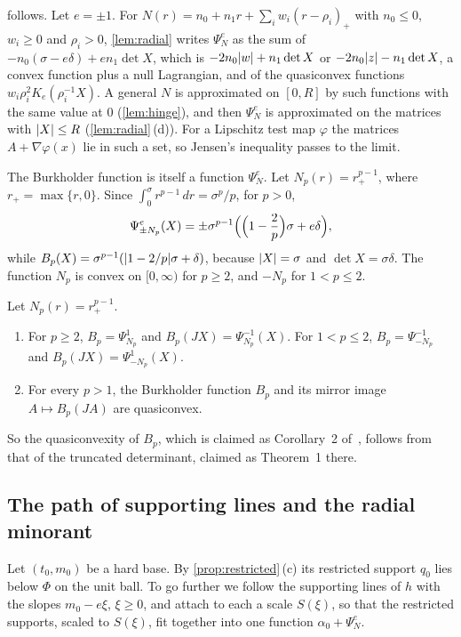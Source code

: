  follows. Let $e=\pm1$. For $N(r)=n_0+n_1r+\sum_iw_i(r-\rho_i)_+$ with $n_0\le0$,
$w_i\ge0$ and $\rho_i>0$, \cref{lem:radial} writes $\Psi^e_N$ as the sum of
$-n_0(\sigma-e\delta)+en_1\det X$, which is $-2n_0\lvert w\rvert+n_1\det X$ or
$-2n_0\lvert z\rvert-n_1\det X$, a convex function plus a null Lagrangian, and of the quasiconvex
functions $w_i\rho_i^2K_e(\rho_i^{-1}X)$. A general $N$ is approximated on $[0,R]$ by such
functions with the same value at $0$ (\cref{lem:hinge}), and then $\Psi^e_N$ is approximated on
the matrices with $\lvert X\rvert\le R$ (\cref{lem:radial}\,(d)). For a Lipschitz test map $\varphi$ the
matrices $A+\nabla\varphi(x)$ lie in such a set, so Jensen's inequality passes to the limit.

The Burkholder function is itself a function $\Psi^e_N$. Let $N_p(r)=r_+^{p-1}$, where
$r_+=\max\{r,0\}$. Since $\int_0^\sigma r^{p-1}\,dr=\sigma^p/p$, for $p>0$,
\[
  \Psi^e_{\pm N_p}(X)=\pm\sigma^{p-1}\Bigl(\Bigl(1-\frac2p\Bigr)\sigma+e\delta\Bigr),
\]
while $B_p(X)=\sigma^{p-1}(\lvert 1-2/p\rvert\sigma+\delta)$, because $\lvert X\rvert=\sigma$ and
$\det X=\sigma\delta$. The function $N_p$ is convex on $[0,\infty)$ for $p\ge2$, and $-N_p$ for
$1<p\le2$.

\begin{corollary}\label{cor:burkholder}
Let $N_p(r)=r_+^{p-1}$.
\begin{enumerate}[label=\textup{(\alph*)}]
\item For $p\ge2$, $B_p=\Psi^1_{N_p}$ and $B_p(JX)=\Psi^{-1}_{N_p}(X)$. For $1<p\le2$,
  $B_p=\Psi^{-1}_{-N_p}$ and $B_p(JX)=\Psi^1_{-N_p}(X)$.
\item For every $p>1$, the Burkholder function $B_p$ and its mirror image $A\mapsto B_p(JA)$
  are quasiconvex.
\end{enumerate}
\end{corollary}

So the quasiconvexity of $B_p$, which is claimed as Corollary~2 of~\cite{SharpHI}, follows from
that of the truncated determinant, claimed as Theorem~1 there.

\subsection{The path of supporting lines and the radial minorant}\label{sec:path}

Let $(t_0,m_0)$ be a hard base. By \cref{prop:restricted}\,(c) its restricted support $q_0$ lies
below $\Phi$ on the unit ball. To go further we follow the supporting lines of $h$ with the
slopes $m_0-e\xi$, $\xi\ge0$, and attach to each a scale $S(\xi)$, so that the restricted
supports, scaled to $S(\xi)$, fit together into one function $\alpha_0+\Psi^e_N$.

